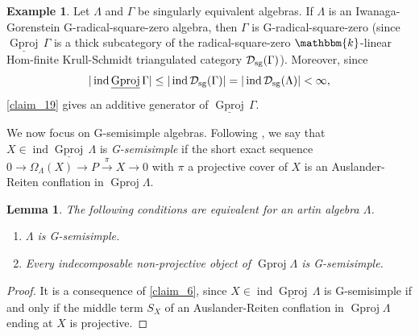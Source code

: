 \documentclass[12pt]{amsart}
\numberwithin{equation}{subsection}
\theoremstyle{plain}
\newtheorem{lemma}[theorem]{Lemma}
\theoremstyle{definition}
\newtheorem{example}[theorem]{Example}
\newcommand{\Gproj}{\operatorname{Gproj}}
\newcommand{\sGproj}{\underline{\operatorname{Gproj}}\,}
\newcommand{\ind}{\operatorname{ind}}
\renewcommand{\L}{\Lambda}
\newcommand{\G}{\Gamma}
\newcommand{\D}{\mathcal{D}}
\begin{document}
\begin{example}\label{example_6}
Let $\L$ and $\G$ be singularly equivalent algebras.
If $\L$ is an Iwanaga-Gorenstein G-radical-square-zero algebra, then $\G$ is G-radical-square-zero (since $\sGproj\G$ is a thick subcategory of the radical-square-zero $\mathbbm{k}$-linear Hom-finite Krull-Schmidt triangulated category $\D_{\rm sg}(\G)$).
Moreover, since 
\begin{align}
    |\ind\sGproj\G| \leq |\ind\D_{\rm sg}(\G)| = |\ind\D_{\rm sg}(\L)| < \infty,
\end{align}
\cref{claim_19} gives an additive generator of $\sGproj\G$. 
\end{example}











We now focus on G-semisimple algebras.
Following \cite[Definition 3.5]{Hafezi-Bahlekeh_2024}, we say that $X\in\ind\sGproj\L$ is {\it G-semisimple} if the short exact sequence $0 \to \Omega_\L(X)  \to P \xrightarrow{\pi} X \to 0$ with $\pi$ a projective cover of $X$ is an Auslander-Reiten conflation in $\Gproj\L$.



\begin{lemma}\label{claim_23}
The following conditions are equivalent for an artin algebra $\L$.
\begin{enumerate}
\item $\L$ is G-semisimple.
\item Every indecomposable non-projective object of $\Gproj\L$ is G-semisimple.
\end{enumerate}
\end{lemma} 
\begin{proof}
It is a consequence of \cref{claim_6}, since $X\in\ind\sGproj\L$ is G-semisimple if and only if the middle term $S_X$ of an Auslander-Reiten conflation in $\Gproj\L$ ending at $X$ is projective.
\end{proof}
\end{document}
